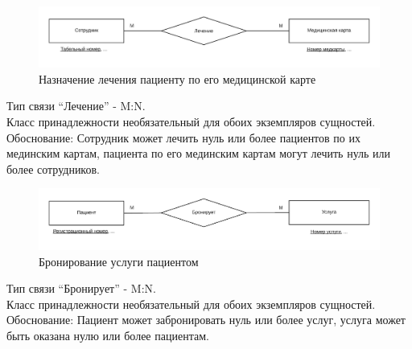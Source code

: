 \documentclass[14pt,a4paper,russian]{extreport}
\begin{document}
\begin{figure}[h!]
        \includegraphics[width=\textwidth]{empcuremedc}
        \caption{Назначение лечения пациенту по его медицинской карте}
        \label{fig:empcuremedc}
\end{figure}

\noindent Тип связи ``Лечение'' - M:N.\\
Класс принадлежности необязательный для обоих экземпляров сущностей.\\
Обоснование: Сотрудник может лечить нуль или более пациентов по их мединским картам,
пациента по его мединским картам могут лечить нуль или более сотрудников.\par
\noindent\hrulefill\par

\begin{figure}[h!]
        \includegraphics[width=\textwidth]{patordserv}
        \caption{Бронирование услуги пациентом}
        \label{fig:patordserv}
\end{figure}

\noindent Тип связи ``Бронирует'' - M:N.\\
Класс принадлежности необязательный для обоих экземпляров сущностей.\\
Обоснование: Пациент может забронировать нуль или более услуг, услуга может быть оказана нулю
или более пациентам.
\end{document}
